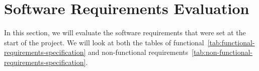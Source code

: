 \section{Software Requirements Evaluation}\label{sec:software-requirements-evaluation}

In this section, we will evaluate the software requirements that were set at the start of the project.
We will look at both the tables of functional~\ref{tab:functional-requirements-specification}
and non-functional requirements~\ref{tab:non-functional-requirements-specification}.



